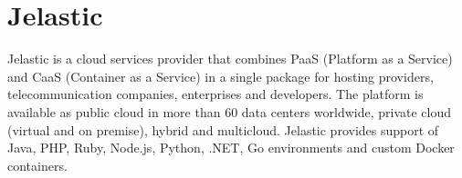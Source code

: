 \section{Jelastic}
Jelastic is a cloud services provider that combines PaaS (Platform as a 
Service) and CaaS (Container as a Service) in a single package for hosting 
providers, telecommunication companies, enterprises and developers. The 
platform is available as public cloud in more than 60 data centers worldwide, 
private cloud (virtual and on premise), hybrid and multicloud. Jelastic 
provides support of Java, PHP, Ruby, Node.js, Python, .NET, Go environments 
and custom Docker containers.
\cite{JelasticWiki}

